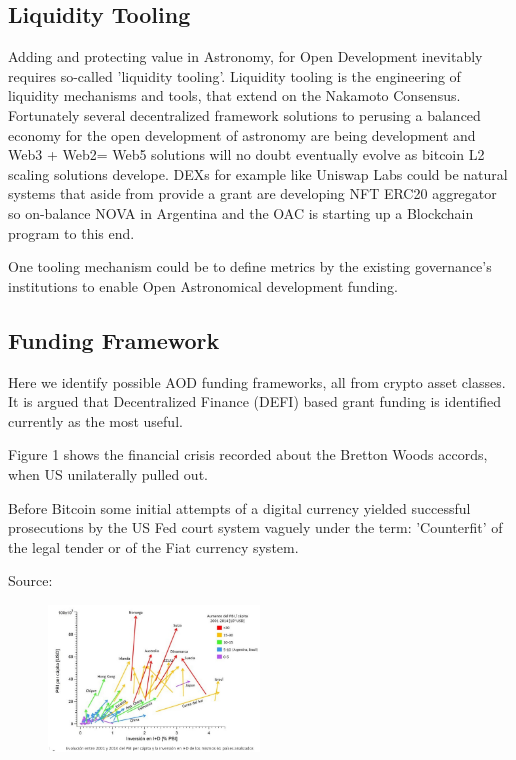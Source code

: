 \documentclass[final,5p,times,twocolumn,authoryear]{elsarticle}
\begin{document}
\subsection{Liquidity Tooling}
\label{btc2:sec:sub:liquidity}
Adding and protecting value in Astronomy, for Open Development inevitably requires so-called 'liquidity tooling'. Liquidity tooling is the engineering of liquidity mechanisms and tools, that extend on the Nakamoto Consensus. Fortunately several decentralized framework solutions to perusing a balanced economy for the open development of astronomy are being development and Web3 + Web2= Web5 solutions will no doubt eventually evolve as bitcoin L2 scaling solutions develope. DEXs for example like Uniswap Labs could be natural systems that aside from provide a grant are developing NFT ERC20 aggregator so on-balance NOVA in Argentina and the OAC is starting up a Blockchain program to this end.

One tooling mechanism could be to define metrics by the existing governance's institutions to enable Open Astronomical development funding.
\subsection{Funding Framework}

Here we identify possible AOD funding frameworks, all from crypto asset classes.  It is argued that Decentralized Finance (DEFI) based grant funding is identified currently as the most useful.

Figure 1 shows the financial crisis recorded about the Bretton Woods accords, when US unilaterally pulled out.

Before Bitcoin some initial attempts of a digital currency yielded successful prosecutions by the US Fed court system vaguely under the term: 'Counterfit' of the legal tender or of the Fiat currency system. 

Source:  
 



\begin{figure}
    \centering
    \includegraphics[width=0.5\textwidth]{figs/Docuemnto_Stefani_2.jpg}
    \caption{\href{https://aargentinapciencias.org/wp-content/uploads/2019/05/Docuemnto_Stefani.pdf}{}} 
\end{figure}
\end{document}
